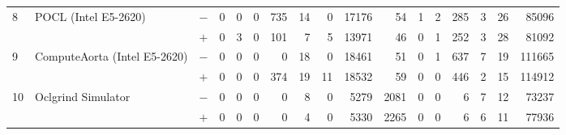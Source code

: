 \begin{tabular}{lll | rrrrrrr | rrrrrrr }
\hline
\multirow{ 2}{*}{8} & \multirow{ 2}{*}{POCL (Intel E5-2620)} & $-$ & 0 & 0 & 0 & 735 & 14 & 0 & 17176       & 54 & 1 & 2 & 285 & 3 & 26 & 85096 \\& & $+$ & 0 & 3 & 0 & 101 & 7 & 5 & 13971 & 46 & 0 & 1 & 252 & 3 & 28 & 81092 \\
\hline
\multirow{ 2}{*}{9} & \multirow{ 2}{*}{ComputeAorta (Intel E5-2620)} & $-$ & 0 & 0 & 0 & 0 & 18 & 0 & 18461       & 51 & 0 & 1 & 637 & 7 & 19 & 111665 \\& & $+$ & 0 & 0 & 0 & 374 & 19 & 11 & 18532 & 59 & 0 & 0 & 446 & 2 & 15 & 114912 \\
\hline
\multirow{ 2}{*}{10} & \multirow{ 2}{*}{Oclgrind Simulator} & $-$ & 0 & 0 & 0 & 0 & 8 & 0 & 5279       & 2081 & 0 & 0 & 6 & 7 & 12 & 73237 \\& & $+$ & 0 & 0 & 0 & 0 & 4 & 0 & 5330 & 2265 & 0 & 0 & 6 & 6 & 11 & 77936 \\
  \bottomrule
\end{tabular}

